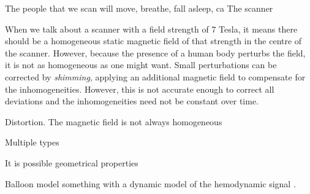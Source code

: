 The people that we scan will move, breathe, fall asleep, ca
The scanner 


When we talk about a scanner with a field strength of 7 Tesla, it means there should be a homogeneous static magnetic field of that strength in the centre of the scanner. However, because the presence of a human body perturbs the field, it is not as homogeneous as one might want. Small perturbations can be corrected by \emph{shimming}, applying an additional magnetic field to compensate for the inhomogeneities. However, this is not accurate enough to correct all deviations and the inhomogeneities need not be constant over time. 


Distortion. The magnetic field is not always homogeneous



Multiple types 


It is possible geometrical properties 


Balloon model \cite{Buxton1998}
something with a dynamic model of the hemodynamic signal \cite{Friston2000}.














